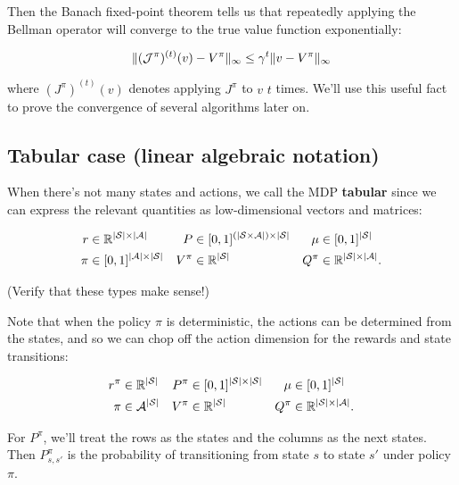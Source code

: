 \documentclass[../main/main]{subfiles}
\begin{document}
Then the Banach fixed-point theorem tells us that repeatedly applying the Bellman operator will converge to the true value function exponentially:

\begin{equation}
    \|(\mathcal{J}^\pi)^{(t)}(v) - V^\pi \|_{\infty} \le \gamma^{t} \| v - V^\pi\|_{\infty} \label{eq:bellman_convergence}
\end{equation}

where $(J^\pi)^{(t)}(v)$ denotes applying $J^\pi$ to $v$ $t$ times. We'll use this useful fact to prove the convergence of several algorithms later on.

\subsection{Tabular case (linear algebraic notation)}

When there's not many states and actions, we call the MDP \textbf{tabular} since we can express the relevant quantities as low-dimensional vectors and matrices:

\begin{align*}
    r &\in \mathbb{R}^{|\mathcal{S}| \times |\mathcal{A}|} &
    P &\in [0, 1]^{(|\mathcal{S} \times \mathcal{A}|) \times |\mathcal{S}|} &
    \mu &\in [0, 1]^{|\mathcal{S}|} \\
    \pi &\in [0, 1]^{|\mathcal{A}| \times |\mathcal{S}|} &
    V^\pi &\in \mathbb{R}^{|\mathcal{S}|} &
    Q^\pi &\in \mathbb{R}^{|\mathcal{S}| \times |\mathcal{A}|}.
\end{align*}

(Verify that these types make sense!)

Note that when the policy $\pi$ is deterministic, the actions can be determined from the states, and so we can chop off the action dimension for the rewards and state transitions:

\begin{align*}
    r^{\pi} &\in \mathbb{R}^{|\mathcal{S}|} & P^{\pi} &\in [0, 1]^{|\mathcal{S}| \times |\mathcal{S}|} & \mu &\in [0, 1]^{|\mathcal{S}|} \\
    \pi &\in \mathcal{A}^{|\mathcal{S}|} & V^\pi &\in \mathbb{R}^{|\mathcal{S}|} & Q^\pi &\in \mathbb{R}^{|\mathcal{S}| \times |\mathcal{A}|}.
\end{align*}

For $P^\pi$, we'll treat the rows as the states and the columns as the next states. Then $P^\pi_{s, s'}$ is the probability of transitioning from state $s$ to state $s'$ under policy $\pi$.
\end{document}
